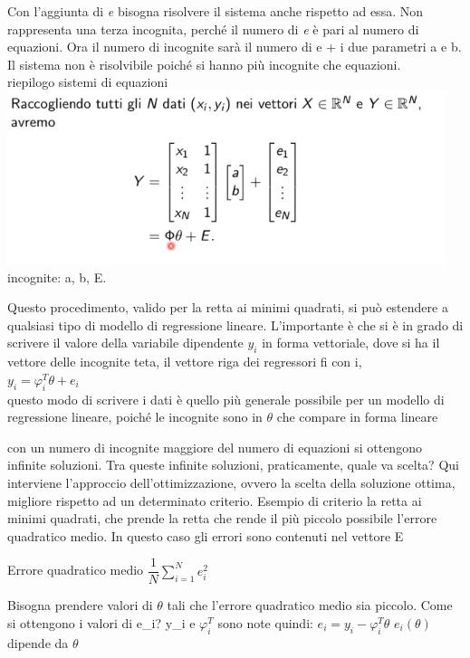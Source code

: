 \documentclass[10pt,a4paper]{article}
\begin{document}
Con l'aggiunta di \textit{e} bisogna risolvere il sistema anche rispetto ad essa. Non rappresenta una terza incognita, perché il numero di \textit{e} è pari al numero di equazioni.
Ora il numero di incognite sarà il numero di e + i due parametri a e b. Il sistema non è risolvibile poiché si hanno più incognite che equazioni.\\

riepilogo sistemi di equazioni \\

\includegraphics[scale=0.61]{matri.png} 
incognite: a, b, E.

Questo procedimento, valido per la retta ai minimi quadrati, si può estendere a qualsiasi tipo di modello di regressione lineare. L'importante è che si è in grado di scrivere il valore della variabile dipendente $ y_{i} $ in forma vettoriale, dove si ha il vettore delle incognite teta, il vettore riga dei regressori fi con i, \\
$ y_{i}=\varphi_{i}^{T} \theta+e_{i} $\\
questo modo di scrivere i dati è quello più generale possibile per un modello di regressione lineare, poiché le incognite sono in $ \theta $ che compare in forma lineare

con un numero di incognite maggiore del numero di equazioni si ottengono infinite soluzioni. Tra queste infinite soluzioni, praticamente, quale va scelta?
Qui interviene l'approccio dell'ottimizzazione, ovvero la scelta della soluzione ottima, migliore rispetto ad un determinato criterio. Esempio di criterio la retta ai minimi quadrati, che prende la retta che rende il più piccolo possibile l'errore quadratico medio. In questo caso gli errori sono contenuti nel vettore E

Errore quadratico medio $ \dfrac{1}{N} \sum_{i=1}^N e_{i}^{2} $

Bisogna prendere valori di $ \theta $ tali che l'errore quadratico medio sia piccolo.
Come si ottengono i valori di e_{i}?
y_{i} e $ \varphi_{i}^{T} $ sono note quindi: $ e_{i}=y_{i}-\varphi_{i}^{T} \theta $
$ e_{i}(\theta) $ dipende da $ \theta $
\end{document}
